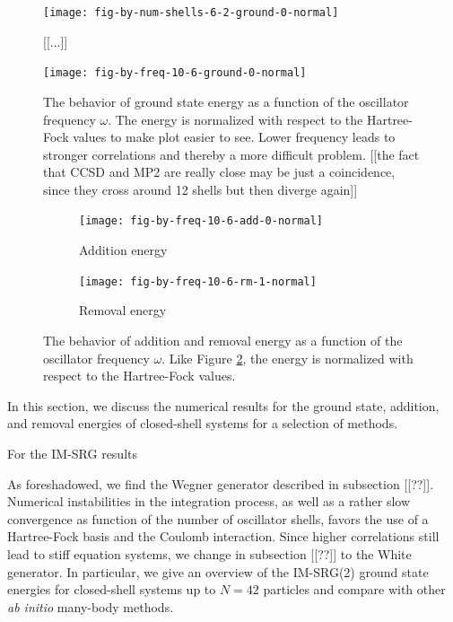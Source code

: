 \begin{figure}
  \centering
  \texttt{[image: fig-by-num-shells-6-2-ground-0-normal]}
  \caption{[[...]]}
  \label{fig:by-num-shells-6-2-ground-0-normal}
\end{figure}

\begin{figure}
  \centering
  \texttt{[image: fig-by-freq-10-6-ground-0-normal]}
  \caption{The behavior of ground state energy as a function of the oscillator frequency $\omega$.  The energy is normalized with respect to the Hartree-Fock values to make plot easier to see.  Lower frequency leads to stronger correlations and thereby a more difficult problem. [[the fact that CCSD and MP2 are really close may be just a coincidence, since they cross around 12 shells but then diverge again]]}
  \label{fig:by-freq-10-6-gs-0-normal}
\end{figure}

\begin{figure}
  \centering
  \begin{subfigure}{0.5\linewidth}
    \centering
    \texttt{[image: fig-by-freq-10-6-add-0-normal]}
    \caption{Addition energy}
    \label{fig:by-freq-10-6-add-0-normal}
  \end{subfigure}%
  \begin{subfigure}{0.5\linewidth}
    \centering
    \texttt{[image: fig-by-freq-10-6-rm-1-normal]}
    \caption{Removal energy}
    \label{fig:by-freq-10-6-rm-1-normal}
  \end{subfigure}
  \caption{The behavior of addition and removal energy as a function of the oscillator frequency $\omega$.  Like Figure \ref{fig:by-freq-10-6-gs-0-normal}, the energy is normalized with respect to the Hartree-Fock values.}
\end{figure}

In this section, we discuss the numerical results for the ground state, addition, and removal energies of closed-shell systems for a selection of methods.

For the IM-SRG results

As foreshadowed, we find the Wegner generator described in subsection [[??]].  Numerical instabilities in the integration process, as well as a rather slow convergence as function of the number of oscillator shells, favors the use of a Hartree-Fock basis and the Coulomb interaction.  Since higher correlations still lead to stiff equation systems, we change in subsection [[??]] to the White generator. In particular, we give an overview of the IM-SRG(2) ground state energies for closed-shell systems up to $N=42$ particles and compare with other \textit{ab initio} many-body methods.

